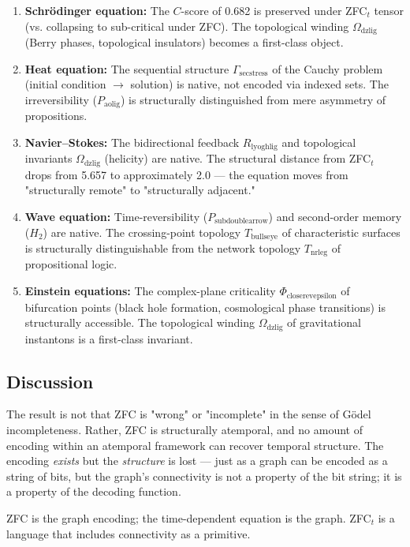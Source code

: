 \documentclass[12pt,a4paper]{article}
\begin{document}
\begin{enumerate}
    \item \textbf{Schrödinger equation:} The $C$-score of 0.682 is preserved under ZFC$_t$ tensor (vs. collapsing to sub-critical under ZFC). The topological winding $\Omega_{\text{dzlig}}$ (Berry phases, topological insulators) becomes a first-class object.
    \item \textbf{Heat equation:} The sequential structure $\Gamma_{\text{secstress}}$ of the Cauchy problem (initial condition $\to$ solution) is native, not encoded via indexed sets. The irreversibility ($P_{\text{aolig}}$) is structurally distinguished from mere asymmetry of propositions.
    \item \textbf{Navier--Stokes:} The bidirectional feedback $R_{\text{lyoghlig}}$ and topological invariants $\Omega_{\text{dzlig}}$ (helicity) are native. The structural distance from ZFC$_t$ drops from 5.657 to approximately 2.0 --- the equation moves from "structurally remote" to "structurally adjacent."
    \item \textbf{Wave equation:} Time-reversibility ($P_{\text{subdoublearrow}}$) and second-order memory ($H_2$) are native. The crossing-point topology $T_{\text{bullseye}}$ of characteristic surfaces is structurally distinguishable from the network topology $T_{\text{nrleg}}$ of propositional logic.
    \item \textbf{Einstein equations:} The complex-plane criticality $\Phi_{\text{closerevepsilon}}$ of bifurcation points (black hole formation, cosmological phase transitions) is structurally accessible. The topological winding $\Omega_{\text{dzlig}}$ of gravitational instantons is a first-class invariant.
\end{enumerate}

\subsection{Discussion}

The result is not that ZFC is "wrong" or "incomplete" in the sense of Gödel incompleteness. Rather, ZFC is structurally atemporal, and no amount of encoding within an atemporal framework can recover temporal structure. The encoding \emph{exists} but the \emph{structure} is lost --- just as a graph can be encoded as a string of bits, but the graph's connectivity is not a property of the bit string; it is a property of the decoding function.

ZFC is the graph encoding; the time-dependent equation is the graph. ZFC$_t$ is a language that includes connectivity as a primitive.
\end{document}
